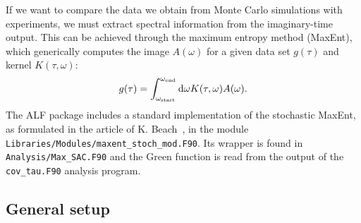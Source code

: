 

If we want to compare the data we obtain from Monte Carlo simulations with experiments, we must extract spectral information from the imaginary-time output.
This can be achieved through the maximum entropy method (MaxEnt), which generically computes the  image  $A(\omega) $ for a given  data  set $g(\tau) $  and kernel $K(\tau,\omega) $:
\begin{equation}
g(\tau) =  \int_{\omega_\mathrm{start}}^{\omega_\mathrm{end}} \mathrm{d}{\omega} K(\tau,\omega) A(\omega).
\end{equation} 
The  ALF package includes a standard implementation of the stochastic MaxEnt, as formulated in the article of K. Beach~\cite{Beach04a}, in the module \texttt{Libraries/Modules/\allowbreak{}maxent\_stoch\_mod.F90}. Its wrapper is found in \texttt{Analysis/Max\_SAC.F90} and the Green function is read from the
output of the \texttt{cov\_tau.F90} analysis program.

\subsection{General setup}

